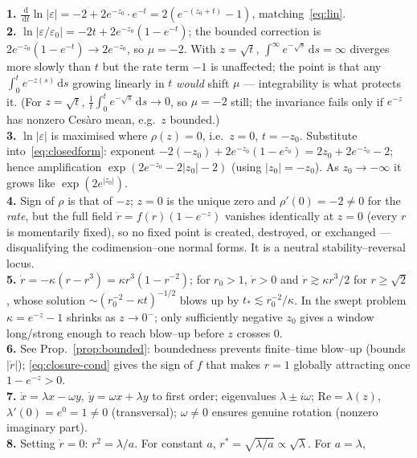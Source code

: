 \documentclass[11pt]{article}
\theoremstyle{plain}
\theoremstyle{definition}
\newcommand{\eps}{\varepsilon}
\newcommand{\dd}{\,\mathrm{d}}
\begin{document}
\noindent\textbf{1.} $\frac{\dd}{\dd t}\ln|\eps|=-2+2e^{-z_0}\!\cdot e^{-t}
=2(e^{-(z_0+t)}-1)$, matching~\eqref{eq:lin}.\\[2pt]
\textbf{2.} $\ln|\eps/\eps_0|=-2t+2e^{-z_0}(1-e^{-t})$; the bounded correction
is $2e^{-z_0}(1-e^{-t})\to2e^{-z_0}$, so $\mu=-2$. With $z=\sqrt t$,
$\int^\infty e^{-\sqrt s}\dd s=\infty$ diverges more slowly than $t$ but the
rate term $-1$ is unaffected; the point is that any $\int_0^t e^{-z(s)}\dd s$
growing linearly in $t$ \emph{would} shift $\mu$ --- integrability is what
protects it. (For $z=\sqrt t$, $\tfrac1t\int_0^t e^{-\sqrt s}\dd s\to0$, so
$\mu=-2$ still; the invariance fails only if $e^{-z}$ has nonzero Ces\`aro
mean, e.g.\ $z$ bounded.)\\[2pt]
\textbf{3.} $\ln|\eps|$ is maximised where $\rho(z)=0$, i.e.\ $z=0$, $t=-z_0$.
Substitute into~\eqref{eq:closedform}: exponent
$-2(-z_0)+2e^{-z_0}(1-e^{z_0})=2z_0+2e^{-z_0}-2$; hence amplification
$\exp(2e^{-z_0}-2|z_0|-2)$ (using $|z_0|=-z_0$). As $z_0\to-\infty$ it grows
like $\exp(2e^{|z_0|})$.\\[2pt]
\textbf{4.} Sign of $\rho$ is that of $-z$; $z=0$ is the unique zero and
$\rho'(0)=-2\neq0$ for the \emph{rate}, but the full field
$\dot r=f(r)(1-e^{-z})$ vanishes identically at $z=0$ (every $r$ is
momentarily fixed), so no fixed point is created, destroyed, or exchanged ---
disqualifying the codimension--one normal forms. It is a neutral
stability--reversal locus.\\[2pt]
\textbf{5.} $\dot r=-\kappa(r-r^3)=\kappa r^3(1-r^{-2})$; for $r_0>1$,
$\dot r>0$ and $\dot r\gtrsim\kappa r^3/2$ for $r\ge\sqrt2$, whose solution
$\sim(r_0^{-2}-\kappa t)^{-1/2}$ blows up by
$t_\ast\lesssim r_0^{-2}/\kappa$. In the swept problem $\kappa=e^{-z}-1$ shrinks
as $z\to0^-$; only sufficiently negative $z_0$ gives a window long/strong enough
to reach blow--up before $z$ crosses $0$.\\[2pt]
\textbf{6.} See Prop.~\ref{prop:bounded}: boundedness prevents finite--time
blow--up (bounds $|\dot r|$); \eqref{eq:closure-cond} gives the sign of $f$ that
makes $r=1$ globally attracting once $1-e^{-z}>0$.\\[2pt]
\textbf{7.} $\dot x=\lambda x-\omega y,\ \dot y=\omega x+\lambda y$ to first
order; eigenvalues $\lambda\pm i\omega$; $\mathrm{Re}=\lambda(z)$,
$\lambda'(0)=e^{0}=1\neq0$ (transversal); $\omega\neq0$ ensures genuine
rotation (nonzero imaginary part).\\[2pt]
\textbf{8.} Setting $\dot r=0$: $r^2=\lambda/a$. For constant $a$,
$r^\ast=\sqrt{\lambda/a}\propto\sqrt\lambda$. For $a=\lambda$,
\end{document}

